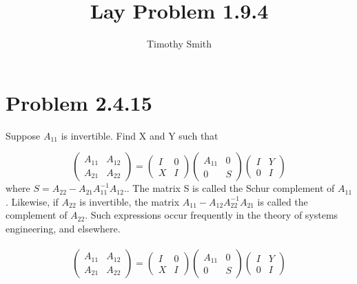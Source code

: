\documentclass{article}
\begin{document}
\author{Timothy Smith}
\title{Lay Problem 1.9.4}
\maketitle

\section*{Problem 2.4.15}

Suppose $A_{11} $ is invertible. Find X and Y such that

\[
\begin{pmatrix}
A_{11} & A_{12} \\
A_{21} & A_{22} 
\end{pmatrix}
=
\begin{pmatrix}
I & 0 \\
X & I 
\end{pmatrix}
\begin{pmatrix}
A_{11} & 0 \\
0 & S
\end{pmatrix}
\begin{pmatrix}
I & Y \\
0 & I
\end{pmatrix}
\]
where $ S= A_{22}-A_{21}A^{-1}_{11}A_{12}. $. The matrix  S is called the Schur complement of $A_{11}$. Likewise, if $A_{22}$ is invertible, the matrix $ A_{11}-A_{12}A^{-1}_{22}A_{21} $ is called the complement of $ A_{22}$. Such expressions occur frequently in the theory of systems engineering, and elsewhere.
\\
\\  
\begin{equation}
\begin{pmatrix}
A_{11} & A_{12} \\
A_{21} & A_{22} 
\end{pmatrix}
=
\begin{pmatrix}
I & 0 \\
X & I 
\end{pmatrix}
\begin{pmatrix}
A_{11} & 0 \\
0 & S
\end{pmatrix}
\begin{pmatrix}
I & Y \\
0 & I
\end{pmatrix}
\end{equation}
\end{document}
